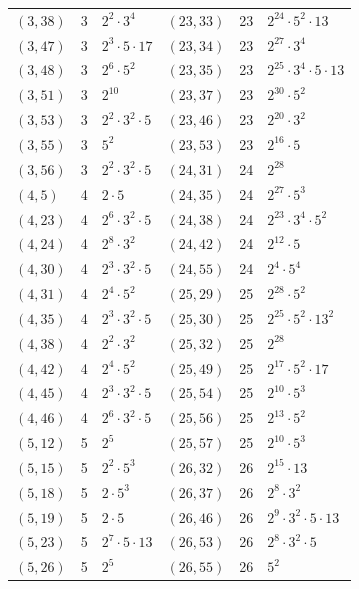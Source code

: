 \documentclass[11pt]{article}
\begin{document}
\begin{longtable}{@{}lrl@{\qquad}lrl@{}}
$(3,38)$ & 3 & $2^{2}\cdot 3^{4}$ & $(23,33)$ & 23 & $2^{24}\cdot 5^{2}\cdot 13$\\
$(3,47)$ & 3 & $2^{3}\cdot 5\cdot 17$ & $(23,34)$ & 23 & $2^{27}\cdot 3^{4}$\\
$(3,48)$ & 3 & $2^{6}\cdot 5^{2}$ & $(23,35)$ & 23 & $2^{25}\cdot 3^{4}\cdot 5\cdot 13$\\
$(3,51)$ & 3 & $2^{10}$ & $(23,37)$ & 23 & $2^{30}\cdot 5^{2}$\\
$(3,53)$ & 3 & $2^{2}\cdot 3^{2}\cdot 5$ & $(23,46)$ & 23 & $2^{20}\cdot 3^{2}$\\
$(3,55)$ & 3 & $5^{2}$ & $(23,53)$ & 23 & $2^{16}\cdot 5$\\
$(3,56)$ & 3 & $2^{2}\cdot 3^{2}\cdot 5$ & $(24,31)$ & 24 & $2^{28}$\\
$(4,5)$ & 4 & $2\cdot 5$ & $(24,35)$ & 24 & $2^{27}\cdot 5^{3}$\\
$(4,23)$ & 4 & $2^{6}\cdot 3^{2}\cdot 5$ & $(24,38)$ & 24 & $2^{23}\cdot 3^{4}\cdot 5^{2}$\\
$(4,24)$ & 4 & $2^{8}\cdot 3^{2}$ & $(24,42)$ & 24 & $2^{12}\cdot 5$\\
$(4,30)$ & 4 & $2^{3}\cdot 3^{2}\cdot 5$ & $(24,55)$ & 24 & $2^{4}\cdot 5^{4}$\\
$(4,31)$ & 4 & $2^{4}\cdot 5^{2}$ & $(25,29)$ & 25 & $2^{28}\cdot 5^{2}$\\
$(4,35)$ & 4 & $2^{3}\cdot 3^{2}\cdot 5$ & $(25,30)$ & 25 & $2^{25}\cdot 5^{2}\cdot 13^{2}$\\
$(4,38)$ & 4 & $2^{2}\cdot 3^{2}$ & $(25,32)$ & 25 & $2^{28}$\\
$(4,42)$ & 4 & $2^{4}\cdot 5^{2}$ & $(25,49)$ & 25 & $2^{17}\cdot 5^{2}\cdot 17$\\
$(4,45)$ & 4 & $2^{3}\cdot 3^{2}\cdot 5$ & $(25,54)$ & 25 & $2^{10}\cdot 5^{3}$\\
$(4,46)$ & 4 & $2^{6}\cdot 3^{2}\cdot 5$ & $(25,56)$ & 25 & $2^{13}\cdot 5^{2}$\\
$(5,12)$ & 5 & $2^{5}$ & $(25,57)$ & 25 & $2^{10}\cdot 5^{3}$\\
$(5,15)$ & 5 & $2^{2}\cdot 5^{3}$ & $(26,32)$ & 26 & $2^{15}\cdot 13$\\
$(5,18)$ & 5 & $2\cdot 5^{3}$ & $(26,37)$ & 26 & $2^{8}\cdot 3^{2}$\\
$(5,19)$ & 5 & $2\cdot 5$ & $(26,46)$ & 26 & $2^{9}\cdot 3^{2}\cdot 5\cdot 13$\\
$(5,23)$ & 5 & $2^{7}\cdot 5\cdot 13$ & $(26,53)$ & 26 & $2^{8}\cdot 3^{2}\cdot 5$\\
$(5,26)$ & 5 & $2^{5}$ & $(26,55)$ & 26 & $5^{2}$\\

\end{longtable}
\end{document}
